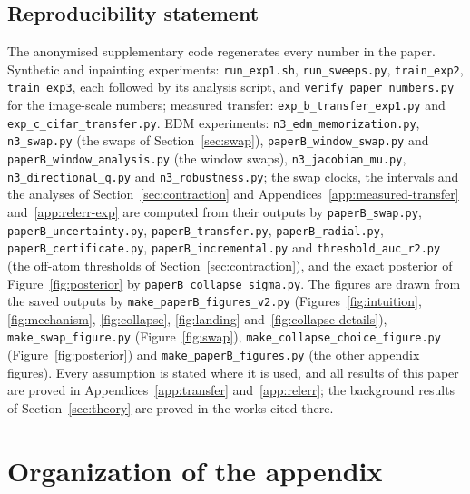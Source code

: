 \documentclass{article} %
\theoremstyle{plain}
\theoremstyle{definition}
\theoremstyle{remark}
\newif\ifproofpointer \proofpointertrue
\begin{document}
\subsection*{Reproducibility statement}
\begingroup\sloppy %
The anonymised supplementary code regenerates every number in the paper.
Synthetic and inpainting experiments: \texttt{run\_exp1.sh}, \texttt{run\_sweeps.py},
\texttt{train\_exp2}, \texttt{train\_exp3}, each followed by its analysis script, and
\texttt{verify\_paper\_numbers.py} for the image-scale
numbers; measured transfer: \texttt{exp\_b\_transfer\_exp1.py} and \texttt{exp\_c\_cifar\_transfer.py}.
EDM experiments: \texttt{n3\_edm\_memorization.py}, \texttt{n3\_swap.py} (the swaps of
Section~\ref{sec:swap}), \texttt{paperB\_window\_swap.py} and \texttt{paperB\_window\_analysis.py}
(the window swaps), \texttt{n3\_jacobian\_mu.py}, \texttt{n3\_directional\_q.py} and
\texttt{n3\_robustness.py}; the swap clocks, the intervals and the analyses of
Section~\ref{sec:contraction} and Appendices~\ref{app:measured-transfer} and~\ref{app:relerr-exp}
are computed from their outputs by \texttt{paperB\_swap.py}, \texttt{paperB\_uncertainty.py},
\texttt{paperB\_transfer.py}, \texttt{paperB\_radial.py}, \texttt{paperB\_certificate.py},
\texttt{paperB\_incremental.py} and \texttt{threshold\_auc\_r2.py} (the off-atom thresholds of
Section~\ref{sec:contraction}), and the exact posterior of Figure~\ref{fig:posterior} by
\texttt{paperB\_collapse\_sigma.py}. The figures are drawn from the saved outputs by
\texttt{make\_paperB\_figures\_v2.py} (Figures~\ref{fig:intuition}, \ref{fig:mechanism},
\ref{fig:collapse}, \ref{fig:landing} and~\ref{fig:collapse-details}), \texttt{make\_swap\_figure.py}
(Figure~\ref{fig:swap}), \texttt{make\_collapse\_choice\_figure.py} (Figure~\ref{fig:posterior}) and
\texttt{make\_paperB\_figures.py} (the other appendix figures).
Every assumption is stated where it is used, and all results of this paper are proved in
Appendices~\ref{app:transfer} and~\ref{app:relerr}; the background results of
Section~\ref{sec:theory} are proved in the works cited there.
\endgroup




\appendix
\proofpointerfalse

\section*{Organization of the appendix}
\end{document}
